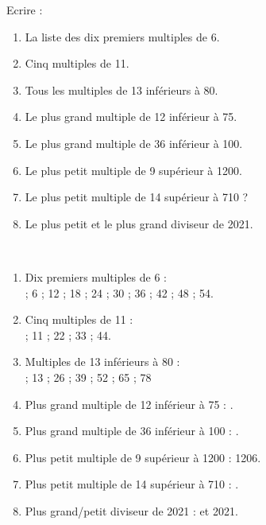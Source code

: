 \begin{exercice*}
    Ecrire :
    \begin{enumerate}
       \item La liste des dix premiers multiples de 6.
       \item Cinq multiples de 11.
       \item Tous les multiples de 13 inférieurs à 80.
       \item Le plus grand multiple de 12 inférieur à 75.
       \item Le plus grand multiple de 36 inférieur à 100.
       \item Le plus petit multiple de 9 supérieur à \num{1 200}.
       \item Le plus petit multiple de 14 supérieur à 710 ?
       \item Le plus petit et le plus grand diviseur de \num{2 021}.
    \end{enumerate}
\end{exercice*}
\begin{corrige}
    \phantom{rrr}\\
    \begin{changemargin}{-5mm}{-5mm}
        \begin{enumerate}
        \item Dix premiers multiples de 6 : \\
            { ; 6 ; 12 ; 18 ; 24 ; 30 ; 36 ; 42 ; 48 ; 54}.
        \item Cinq multiples de 11 : \\
            { ; 11 ; 22 ; 33 ; 44}.
        \item Multiples de 13 inférieurs à 80 : \\
            { ; 13 ; 26 ; 39 ; 52 ; 65 ; 78}
        \item Plus grand multiple de 12 inférieur à 75 : {}.
        \item Plus grand multiple de 36 inférieur à 100 : {}.
        \item Plus petit multiple de 9 supérieur à \num{1 200} : {\red \num{1 206}}.
        \item Plus petit multiple de 14 supérieur à 710 : {}.
        \item Plus grand/petit diviseur de \num{2 021} : { et \num{2 021}}.
        \end{enumerate}
    \end{changemargin}
\end{corrige}